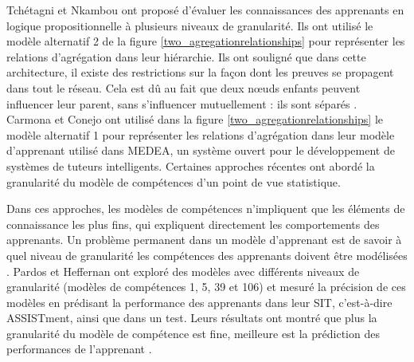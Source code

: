 Tchétagni et Nkambou ont proposé d’évaluer les connaissances des apprenants en logique propositionnelle à plusieurs niveaux de granularité. Ils ont utilisé le modèle alternatif 2 de la figure \ref{two_agregationrelationships} pour représenter les relations d'agrégation dans leur hiérarchie. Ils ont souligné que dans cette architecture, il existe des restrictions sur la façon dont les preuves se propagent dans tout le réseau. Cela est dû au fait que deux nœuds enfants peuvent influencer leur parent, sans s'influencer mutuellement : ils sont séparés \cite{hierarchical_representation_evaluation_of_Student_in_ITS}. \\
Carmona et Conejo ont utilisé dans la figure \ref{two_agregationrelationships} le modèle alternatif 1 pour représenter les relations d'agrégation dans leur modèle d'apprenant utilisé dans MEDEA, un système ouvert pour le développement de systèmes de tuteurs intelligents. Certaines approches récentes ont abordé la granularité du modèle de compétences d'un point de vue statistique. 

Dans ces approches, les modèles de compétences n'impliquent que les éléments de connaissance les plus fins, qui expliquent directement les comportements des apprenants. Un problème permanent dans un modèle d’apprenant est de savoir à quel niveau de granularité les compétences des apprenants doivent être modélisées \cite{learner_model_in_distributed_environment}. Pardos et Heffernan ont exploré des modèles avec différents niveaux de granularité (modèles de compétences 1, 5, 39 et 106) et mesuré la précision de ces modèles en prédisant la performance des apprenants dans leur SIT, c'est-à-dire ASSISTment, ainsi que dans un test. Leurs résultats ont montré que plus la granularité du modèle de compétence est fine, meilleure est la prédiction des performances de l'apprenant \cite{Effect_Model_Granularity_on_Student_Performance_Prediction_Using_Bayesian_Networks}.

